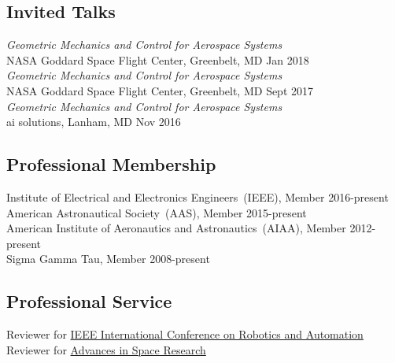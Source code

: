 
\subsection*{Invited Talks}
{}
\textit{Geometric Mechanics and Control for Aerospace Systems} \\NASA Goddard Space Flight Center, Greenbelt, MD \hfill {Jan 2018}\\
\textit{Geometric Mechanics and Control for Aerospace Systems} \\NASA Goddard Space Flight Center, Greenbelt, MD \hfill {Sept 2017}\\
\textit{Geometric Mechanics and Control for Aerospace Systems} \\ai solutions, Lanham, MD \hfill {Nov 2016}

\subsection*{Professional Membership}
{}
Institute of Electrical and Electronics Engineers~(IEEE), Member \hfill {2016-present} \\
American Astronautical Society~(AAS), Member \hfill {2015-present} \\
American Institute of Aeronautics and Astronautics~(AIAA), Member \hfill {2012-present} \\
Sigma Gamma Tau, Member \hfill  {2008-present} \\

\subsection*{Professional Service}
Reviewer for \href{http://www.ieee-ras.org/conferences-workshops/fully-sponsored/icra}{IEEE International Conference on Robotics and Automation}\\
Reviewer for \href{http://www.journals.elsevier.com/advances-in-space-research/}{Advances in Space Research}
